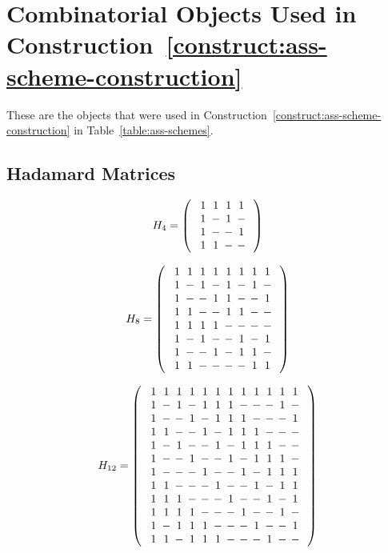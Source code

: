 \chapter[Combinatorial Objects Used in Construction~\ref*{construct:ass-scheme-construction}]{Combinatorial Objects Used in Construction~\ref*{construct:ass-scheme-construction}}
\label{app:comb-objects}

These are the objects that were used in Construction~\ref{construct:ass-scheme-construction} in Table~\ref{table:ass-schemes}.

\section[Hadamard Matrices]{Hadamard Matrices}
\label{sec:h-mats}

\appendixarray
$$H_{4}=
\left(\begin{array}{c}
\Zp\Zp\Zp\Zp\\
\Zp\Zm\Zp\Zm\\
\Zp\Zm\Zm\Zp\\
\Zp\Zp\Zm\Zm
\end{array}\right)
$$

$$H_{8}=
\left(\begin{array}{c}
\Zp\Zp\Zp\Zp\Zp\Zp\Zp\Zp\\
\Zp\Zm\Zp\Zm\Zp\Zm\Zp\Zm\\
\Zp\Zm\Zm\Zp\Zp\Zm\Zm\Zp\\
\Zp\Zp\Zm\Zm\Zp\Zp\Zm\Zm\\
\Zp\Zp\Zp\Zp\Zm\Zm\Zm\Zm\\
\Zp\Zm\Zp\Zm\Zm\Zp\Zm\Zp\\
\Zp\Zm\Zm\Zp\Zm\Zp\Zp\Zm\\
\Zp\Zp\Zm\Zm\Zm\Zm\Zp\Zp
\end{array}\right)
$$

$$H_{12}=
\left(\begin{array}{c}
\Zp\Zp\Zp\Zp\Zp\Zp\Zp\Zp\Zp\Zp\Zp\Zp\\
\Zp\Zm\Zp\Zm\Zp\Zp\Zp\Zm\Zm\Zm\Zp\Zm\\
\Zp\Zm\Zm\Zp\Zm\Zp\Zp\Zp\Zm\Zm\Zm\Zp\\
\Zp\Zp\Zm\Zm\Zp\Zm\Zp\Zp\Zp\Zm\Zm\Zm\\
\Zp\Zm\Zp\Zm\Zm\Zp\Zm\Zp\Zp\Zp\Zm\Zm\\
\Zp\Zm\Zm\Zp\Zm\Zm\Zp\Zm\Zp\Zp\Zp\Zm\\
\Zp\Zm\Zm\Zm\Zp\Zm\Zm\Zp\Zm\Zp\Zp\Zp\\
\Zp\Zp\Zm\Zm\Zm\Zp\Zm\Zm\Zp\Zm\Zp\Zp\\
\Zp\Zp\Zp\Zm\Zm\Zm\Zp\Zm\Zm\Zp\Zm\Zp\\
\Zp\Zp\Zp\Zp\Zm\Zm\Zm\Zp\Zm\Zm\Zp\Zm\\
\Zp\Zm\Zp\Zp\Zp\Zm\Zm\Zm\Zp\Zm\Zm\Zp\\
\Zp\Zp\Zm\Zp\Zp\Zp\Zm\Zm\Zm\Zp\Zm\Zm
\end{array}\right)
$$

